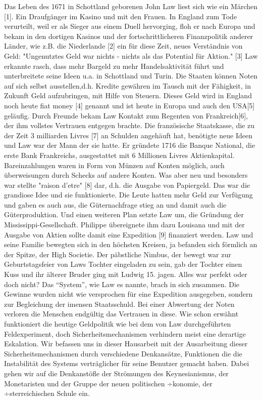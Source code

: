 Das Leben des 1671 in Schottland geborenen John Law liest sich wie ein M{\"a}rchen [1]. Ein Draufg{\"a}nger im Kasino und mit den Frauen. In England zum Tode verurteilt, weil er als Sieger aus einem Duell hervorging, floh er nach Europa und bekam in den dortigen Kasinos und der fortschrittlicheren Finanzpolitik anderer L{\"a}nder, wie z.B. die Niederlande [2] ein f{\"u}r diese Zeit, neues Verst{\"a}ndnis von Geld: "Ungenutztes Geld war nichts - nichts als das Potential f{\"u}r Aktion." [3] Law erkannte rasch, dass mehr Bargeld zu mehr Handelsaktivit{\"a}t f{\"u}hrt und unterbreitete seine Ideen u.a. in Schottland und Turin. Die Staaten k{\"o}nnen Noten auf sich selbst ausstellen,d.h. Kredite gew{\"a}hren im Tausch mit der F{\"a}higkeit, in Zukunft Geld aufzubringen, mit Hilfe von Steuern. Dieses Geld wird in England noch heute fiat money [4] genannt und ist heute in Europa und auch den USA[5] gel{\"a}ufig. Durch Freunde bekam Law Kontakt zum Regenten von Frankreich[6], der ihm vollstes Vertrauen entgegen brachte. Die franz{\"o}sische Staatskasse, die zu der Zeit 3 milliarden Livres [7] an Schulden angeh{\"a}uft hat, ben{\"o}tigte neue Ideen und Law war der Mann der sie hatte. Er gr{\"u}ndete 1716 die Banque National, die erste Bank Frankreichs, ausgestattet mit 6 Millionen Livres Aktienkapital. Bareinzahlungen waren in Form von M{\"u}nzen auf Konten m{\"o}glich, auch {\"u}berweisungen durch Schecks auf andere Konten. Was aber neu und besonders war stellte "raison d'etre" [8] dar, d.h. die Ausgabe von Papiergeld. Das war die grandiose Idee und sie funktionierte. Die Leute hatten mehr Geld zur Verf{\"u}gung und gaben es auch aus, die G{\"u}ternachfrage stieg an und damit auch die G{\"u}terproduktion. Und einen weiteren Plan setzte Law um, die Gr{\"u}ndung der Mississippi-Gesellschaft. Philippe {\"u}bereignete ihm dazu Louisana und mit der Ausgabe von Aktien sollte damit eine Expedition [9] finanziert werden. Law und seine Familie bewegten sich in den h{\"o}chsten Kreisen, ja befanden sich f{\"o}rmlich an der Spitze, der High Societie. Der p{\"a}bstliche Nimbus, der bewegt war zur Geburtstagsfeier von Laws Tochter eingeladen zu sein, gab der Tochter einen Kuss und ihr {\"a}lterer Bruder ging mit Ludwig 15. jagen.
Alles war perfekt oder doch nicht? Das "`System"', wie Law es nannte, brach in sich zusammen. Die Gewinne wurden nicht wie versprochen f{\"u}r eine Expedition ausgegeben, sondern zur Begleichung der imensen Staatsschuld. Bei einer Abwertung der Noten verloren die Menschen endg{\"u}ltig das Vertrauen in diese.
Wie schon erw{\"a}hnt funktioniert die heutige Geldpolitik wie bei dem von Law durchgef{\"u}hrten Feldexperiment, doch Sicherheitsmechanismen verhindern meist eine derartige Eskalation.
Wir befassen uns in dieser Hausarbeit mit der Ausarbeitung dieser Sicherheitsmechanismen durch verschiedene Denkans{\"a}tze, Funktionen die die Instabilit{\"a}t des Systems vertr{\"a}glicher f{\"u}r seine Benutzer gemacht haben. Dabei gehen wir auf die Denkanst{\"o}ﬂe der Str{\"o}mungen des Keynesianismus, der Monetaristen und der Gruppe der neuen politischen ÷konomie, der ÷sterreichischen Schule ein.

